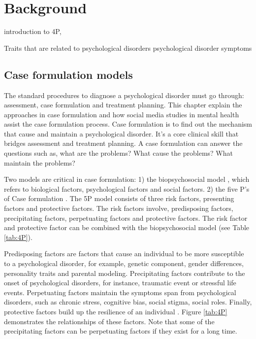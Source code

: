 
\chapter{Background}

introduction to 4P, 

Traits that are related to psychological disorders
psychological disorder symptoms

\section{Case formulation models}
The standard procedures to diagnose a psychological disorder must go through: assessment, case formulation and treatment planning. This chapter explain the approaches in case formulation and how social media studies in mental health assist the case formulation process. Case formulation is to find out the mechanism that cause and maintain a psychological disorder. It's a core clinical skill that bridges assessment and treatment planning. A case formulation can answer the questions such as, what are the problems? What cause the problems? What maintain the problems? 

Two models are critical in case formulation: 1) the biopsychosocial model \cite{george1980clinical}, which refers to biological factors, psychological factors and social factors.  2) the five P's of Case formulation \cite{macneil2012diagnosis}. The 5P model consists of three risk factors, presenting factors and protective factors. The risk factors involve, predisposing factors, precipitating factors, perpetuating factors and protective factors. The risk factor and protective factor can be combined with the  biopsychosocial model (see Table \ref{tab:4P}). 

Predisposing factors are factors that cause an individual to be more susceptible to a psychological disorder, for example, genetic component, gender differences, personality traits and parental modeling. Precipitating factors contribute to the onset of psychological disorders, for instance, traumatic event or stressful life events. Perpetuating factors maintain the symptoms span from psychological disorders, such as chronic stress, cognitive bias, social stigma, social roles. Finally, protective factors build up the resilience of an individual \cite{macneil2012diagnosis}. Figure \ref{tab:4P} demonstrates the relationships of these factors. Note that some of the precipitating factors can be perpetuating factors if they exist for a long time. 

